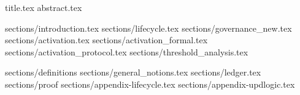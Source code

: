 \documentclass{llncs}
\begin{document}
{title.tex}
{abstract.tex}

\clearpage

\tableofcontents
\listoffigures
\listoftables

\clearpage
{sections/introduction.tex}
{sections/lifecycle.tex}
{sections/governance_new.tex}
{sections/activation.tex}
{sections/activation_formal.tex}
{sections/activation_protocol.tex}
{sections/threshold_analysis.tex}
\clearpage


\appendix
{sections/definitions}
{sections/general_notions.tex}
{sections/ledger.tex}
{sections/proof}
{sections/appendix-lifecycle.tex}
{sections/appendix-updlogic.tex}
\end{document}
